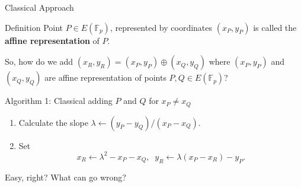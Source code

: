\documentclass[xcolor={usenames,dvipsnames}]{beamer}
\begin{document}
    \begin{frame}{Classical Approach}
        \begin{block}{Definition}
            Point $P \in E(\mathbb{F}_p)$, represented by coordinates $(x_P,y_P)$ is called the \textbf{affine representation} of $P$.
        \end{block}
        \pause
        So, how do we add $(x_R,y_R) = (x_P,y_P) \oplus (x_Q,y_Q)$ where $(x_P,y_P)$ and $(x_Q,y_Q)$ are affine representation of points $P,Q \in E(\mathbb{F}_p)$?
        \pause
        \begin{block}{Algorithm 1: Classical adding $P$ and $Q$ for $x_P \neq x_Q$}
        \begin{enumerate}
           \item Calculate the slope $
                \lambda \gets (y_P-y_Q)/(x_P-x_Q)$. \pause
           \item Set 
           \begin{equation*}
           x_R \gets \lambda^2 - x_P - x_Q, \;\; y_R \gets \lambda(x_P - x_R) - y_P.
           \end{equation*}
        \end{enumerate}
        \end{block}

        Easy, right? What can go wrong?
    \end{frame}
\end{document}
